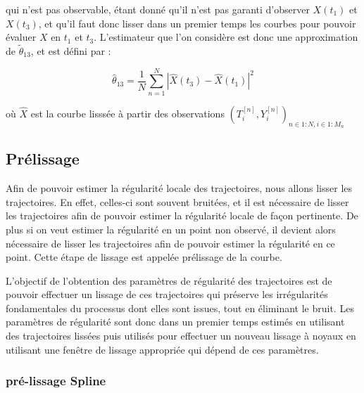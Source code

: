 qui n'est pas observable, étant donné qu'il n'est pas garanti d'observer $X(t_1)$ et $X(t_3)$, et qu'il faut donc lisser dans un premier temps les courbes pour pouvoir évaluer $X$ en $t_1$ et $t_3$. L'estimateur que l'on considère est donc une approximation de $\tilde \theta_{13}$, et est défini par :

$$\hat \theta_{13} = \frac 1 N \sum\limits_{n=1}^N \left| \hat X(t_3) - \hat X(t_1) \right|^2$$

où $\hat X$ est la courbe lisssée à partir des observations $( T_i^{[n]}, Y_i^{[n]} )_{n \in 1:N, i \in 1:M_n}$



\subsection{Prélissage}


Afin de pouvoir estimer la régularité locale des trajectoires, nous allons lisser les trajectoires. En effet, celles-ci sont souvent bruitées, et il est nécessaire de lisser les trajectoires afin de pouvoir estimer la régularité locale de façon pertinente. De plus si on veut estimer la régularité en un point non observé, il devient alors nécessaire de lisser les trajectoires afin de pouvoir estimer la régularité en ce point. Cette étape de lissage est appelée prélissage de la courbe.


L'objectif de l'obtention des paramètres de régularité des trajectoires est de pouvoir effectuer un lissage de ces trajectoires qui préserve les irrégularités fondamentales du processus dont elles sont issues, tout en éliminant le bruit. Les paramètres de régularité sont donc dans un premier temps estimés en utilisant des trajectoires lissées puis utilisés pour effectuer un nouveau lissage à noyaux en utilisant une fenêtre de lissage appropriée qui dépend de ces paramètres. 


\subsubsection{pré-lissage Spline}

